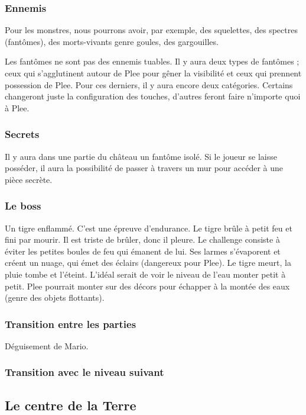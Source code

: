 \documentclass{article}
\begin{document}
\subsubsection{Ennemis}
Pour les monstres, nous pourrons avoir, par exemple, des squelettes,
des spectres (fantômes), des morts-vivants genre goules, des
gargouilles.

Les fantômes ne sont pas des ennemis tuables. Il y aura deux types de
fantômes ; ceux qui s'agglutinent autour de Plee pour gêner la
visibilité et ceux qui prennent possession de Plee. Pour ces derniers,
il y aura encore deux catégories. Certains changeront juste la
configuration des touches, d'autres feront faire n'importe quoi à
Plee.

\subsubsection{Secrets}
Il y aura dans une partie du château un fantôme isolé. Si le joueur se
laisse posséder, il aura la possibilité de passer à travers un mur
pour accéder à une pièce secrète.

\subsubsection{Le boss}
Un tigre enflammé. C'est une épreuve d'endurance. Le tigre brûle à
petit feu et fini par mourir. Il est triste de brûler, donc il pleure.
Le challenge consiste à éviter les petites boules de feu qui émanent
de lui. Ses larmes s'évaporent et créent un nuage, qui émet des
éclairs (dangereux pour Plee). Le tigre meurt, la pluie tombe et
l'éteint. L'idéal serait de voir le niveau de l'eau monter petit à
petit. Plee pourrait monter sur des décors pour échapper à la montée
des eaux (genre des objets flottants).

\subsubsection{Transition entre les parties}
Déguisement de Mario.

\subsubsection{Transition avec le niveau suivant}

\subsection{Le centre de la Terre}
\end{document}
